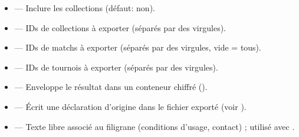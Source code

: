 \documentclass[letterpaper,10pt,french]{sphinxmanual}
\begin{document}
\begin{itemize}
\item {} 
\sphinxAtStartPar
{} — Inclure les collections (défaut: non).

\item {} 
\sphinxAtStartPar
{} — IDs de collections à exporter (séparés par des virgules).

\item {} 
\sphinxAtStartPar
{} — IDs de matchs à exporter (séparés par des virgules, vide = tous).

\item {} 
\sphinxAtStartPar
{} — IDs de tournois à exporter (séparés par des virgules).

\item {} 
\sphinxAtStartPar
{} — Enveloppe le résultat dans un conteneur chiffré ().

\item {} 
\sphinxAtStartPar
{} — Écrit une déclaration d’origine  dans le fichier
exporté (voir {\hyperref[\detokenize{manuel:diffusion-controlee}]{}}).

\item {} 
\sphinxAtStartPar
{} — Texte libre associé au filigrane (conditions
d’usage, contact) ; utilisé avec .

\end{itemize}

\sphinxAtStartPar
{}
\end{document}
